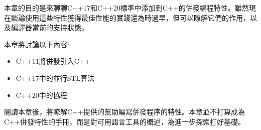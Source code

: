 本章的目的是來聊聊C++17和C++20標準中添加到C++的併發編程特性。雖然現在談論使用這些特性獲得最佳性能的實踐還為時過早，但可以瞭解它們的作用，以及編譯器當前的支持狀態。

本章將討論以下內容:

\begin{itemize}
\item
C++11將併發引入C++

\item
C++17中的並行STL算法

\item
C++20中的協程
\end{itemize}

閱讀本章後，將瞭解C++提供的幫助編寫併發程序的特性。本章並不打算成為C++併發特性的手冊，而是對可用語言工具的概述，為進一步探索打好基礎。